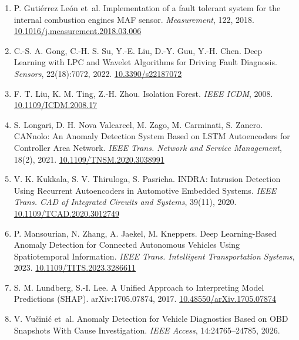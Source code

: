 \begin{enumerate}
{{  Applications of AI}, 117:105524, 2023.
  \href{https://doi.org/10.1016/j.engappai.2022.105524}{10.1016/j.engappai.2022.105524}}
\item
  \label{r17}{P. Gutiérrez León et~al. Implementation of
  a fault tolerant system for the internal combustion
  engine\textquotesingle s MAF sensor. \emph{Measurement}, 122, 2018.
  \href{https://doi.org/10.1016/j.measurement.2018.03.006}{10.1016/j.measurement.2018.03.006}}
\item
  \label{r18}{C.-S. A. Gong, C.-H. S. Su, Y.-E. Liu,
  D.-Y. Guu, Y.-H. Chen. Deep Learning with LPC and Wavelet Algorithms
  for Driving Fault Diagnosis. \emph{Sensors}, 22(18):7072, 2022.
  \href{https://doi.org/10.3390/s22187072}{10.3390/s22187072}}
\item
  \label{r19}{F. T. Liu, K. M. Ting, Z.-H. Zhou.
  Isolation Forest. \emph{IEEE ICDM}, 2008.
  \href{https://doi.org/10.1109/ICDM.2008.17}{10.1109/ICDM.2008.17}}
\item
  \label{r20}{S. Longari, D. H. Nova Valcarcel, M. Zago,
  M. Carminati, S. Zanero. CANnolo: An Anomaly Detection System Based on
  LSTM Autoencoders for Controller Area Network. \emph{IEEE Trans.
  Network and Service Management}, 18(2), 2021.
  \href{https://doi.org/10.1109/TNSM.2020.3038991}{10.1109/TNSM.2020.3038991}}
\item
  \label{r21}{V. K. Kukkala, S. V. Thiruloga, S.
  Pasricha. INDRA: Intrusion Detection Using Recurrent Autoencoders in
  Automotive Embedded Systems. \emph{IEEE Trans. CAD of Integrated
  Circuits and Systems}, 39(11), 2020.
  \href{https://doi.org/10.1109/TCAD.2020.3012749}{10.1109/TCAD.2020.3012749}}
\item
  \label{r22}{P. Mansourian, N. Zhang, A. Jaekel, M.
  Kneppers. Deep Learning-Based Anomaly Detection for Connected
  Autonomous Vehicles Using Spatiotemporal Information. \emph{IEEE
  Trans. Intelligent Transportation Systems}, 2023.
  \href{https://doi.org/10.1109/TITS.2023.3286611}{10.1109/TITS.2023.3286611}}
\item
  \label{r23}{S. M. Lundberg, S.-I. Lee. A Unified
  Approach to Interpreting Model Predictions (SHAP). arXiv:1705.07874,
  2017.
  \href{https://doi.org/10.48550/arXiv.1705.07874}{10.48550/arXiv.1705.07874}}
\item
  \label{r24}{V. Vučinić et~al. Anomaly Detection for
  Vehicle Diagnostics Based on OBD Snapshots With Cause Investigation.
  \emph{IEEE Access}, 14:24765--24785, 2026.
}
\end{enumerate}
